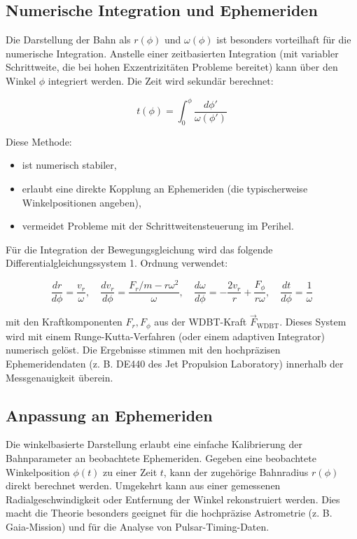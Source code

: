 \subsection{Numerische Integration und Ephemeriden}
\label{sec:weber_numerik}

Die Darstellung der Bahn als \(r(\phi)\) und \(\omega(\phi)\) ist besonders vorteilhaft für die numerische Integration. Anstelle einer zeitbasierten Integration (mit variabler Schrittweite, die bei hohen Exzentrizitäten Probleme bereitet) kann über den Winkel \(\phi\) integriert werden. Die Zeit wird sekundär berechnet:

\[
t(\phi) = \int_0^\phi \frac{d\phi'}{\omega(\phi')}
\]

Diese Methode:
\begin{itemize}
    \item ist numerisch stabiler,
    \item erlaubt eine direkte Kopplung an Ephemeriden (die typischerweise Winkelpositionen angeben),
    \item vermeidet Probleme mit der Schrittweitensteuerung im Perihel.
\end{itemize}

Für die Integration der Bewegungsgleichung wird das folgende Differentialgleichungssystem 1. Ordnung verwendet:

\[
\frac{dr}{d\phi} = \frac{v_r}{\omega}, \quad
\frac{dv_r}{d\phi} = \frac{F_r/m - r\omega^2}{\omega}, \quad
\frac{d\omega}{d\phi} = -\frac{2v_r}{r} + \frac{F_\phi}{r\omega}, \quad
\frac{dt}{d\phi} = \frac{1}{\omega}
\]

mit den Kraftkomponenten \(F_r, F_\phi\) aus der WDBT-Kraft \(\vec{F}_{\text{WDBT}}\). Dieses System wird mit einem Runge-Kutta-Verfahren (oder einem adaptiven Integrator) numerisch gelöst. Die Ergebnisse stimmen mit den hochpräzisen Ephemeridendaten (z. B. DE440 des Jet Propulsion Laboratory) innerhalb der Messgenauigkeit überein.

\subsection{Anpassung an Ephemeriden}
\label{sec:weber_ephemeriden}

Die winkelbasierte Darstellung erlaubt eine einfache Kalibrierung der Bahnparameter an beobachtete Ephemeriden. Gegeben eine beobachtete Winkelposition \(\phi(t)\) zu einer Zeit \(t\), kann der zugehörige Bahnradius \(r(\phi)\) direkt berechnet werden. Umgekehrt kann aus einer gemessenen Radialgeschwindigkeit oder Entfernung der Winkel rekonstruiert werden. Dies macht die Theorie besonders geeignet für die hochpräzise Astrometrie (z. B. Gaia-Mission) und für die Analyse von Pulsar-Timing-Daten.

